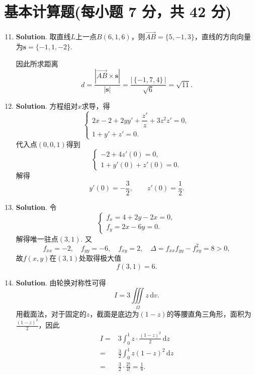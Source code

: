 \documentclass[../main.tex]{subfiles}
\begin{document}
\section{基本计算题(每小题 7 分，共 42 分)}
\begin{enumerate}
    \setcounter{enumi}{10}
    \item \textbf{Solution}. 取直线$L$上一点$B(6,1,6)$，则$\overrightarrow{AB}=\{5,-1,3\}$，直线的方向向量为$\boldsymbol{s}=\{-1,1,-2\}$.

          因此所求距离
          \[
              d=\frac{|\overrightarrow{AB}\times\boldsymbol{s}|}{|\boldsymbol{s}|}
              =\frac{|\,\{-1,7,4\}\,|}{\sqrt6}= \sqrt{11}.
          \]

    \item \textbf{Solution}. 方程组对$x$求导，得
          \[
              \begin{cases}
                  2x-2+2yy'+\dfrac{z'}{z}+3z^{2}z'=0, \\
                  1+y'+z'=0.
              \end{cases}
          \]
          代入点$(0,0,1)$得到
          \[
              \begin{cases}
                  -2+4z'(0)=0, \\
                  1+y'(0)+z'(0)=0.
              \end{cases}
          \]
          解得
          \[
              y'(0)=-\frac32,\qquad z'(0)=\frac12.
          \]

    \item \textbf{Solution}. 令
          \[
              \begin{cases}
                  f_{x}=4+2y-2x=0, \\
                  f_{y}=2x-6y=0.
              \end{cases}
          \]
          解得唯一驻点$(3,1)$.
          又
          \[
              f_{xx}=-2,\quad f_{yy}=-6,\quad f_{xy}=2,\quad \Delta=f_{xx}f_{yy}-f_{xy}^{2}=8>0,
          \]
          故$f(x,y)$在$(3,1)$处取得极大值
          \[
              f(3,1)=6.
          \]

    \item \textbf{Solution}. 由轮换对称性可得
          \[
              I=3\iiint\limits_{\Omega}z\,\mathrm{d}v.
          \]
          用截面法，对于固定的$z$，截面是底边为$(1-z)$的等腰直角三角形，面积为$\frac{(1-z)^{2}}{2}$，因此
          \[
              \begin{aligned}
                  I = {} & 3\int_{0}^{1}z\cdot\frac{(1-z)^{2}}{2}\,\mathrm{d}z \\
                  = {}   & \frac{3}{2}\int_{0}^{1}z(1-z)^2\,\mathrm{d}z        \\
                  = {}   & \frac{3}{2}\cdot\frac{2!}{4!} = \frac{1}{8}.
              \end{aligned}
          \]


\end{enumerate}
\end{document}
